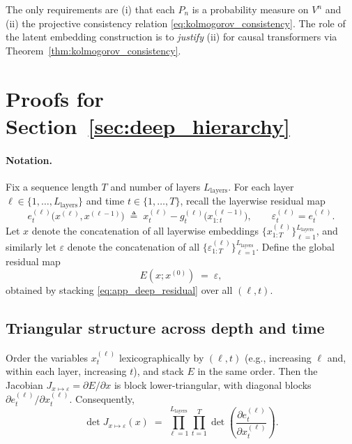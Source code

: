 \documentclass[11pt]{article}
\begin{document}
\begin{remark}
The only requirements are (i) that each $P_n$ is a probability measure on $V^n$ and (ii) the projective consistency relation
\eqref{eq:kolmogorov_consistency}. The role of the latent embedding construction is to \emph{justify} (ii)
for causal transformers via Theorem~\ref{thm:kolmogorov_consistency}.
\end{remark}


\section{Proofs for Section~\ref{sec:deep_hierarchy}}
\label{app:proofs_deep}

\paragraph{Notation.}
Fix a sequence length $T$ and number of layers $L_{\mathrm{layers}}$.
For each layer $\ell\in\{1,\dots,L_{\mathrm{layers}}\}$ and time $t\in\{1,\dots,T\}$, recall the
layerwise residual map
\begin{equation}
e^{(\ell)}_t\!\big(x^{(\ell)},x^{(\ell-1)}\big)
\;\triangleq\;
x^{(\ell)}_t - g^{(\ell)}_t\!\big(x^{(\ell-1)}_{1:t}\big),
\qquad
\varepsilon^{(\ell)}_t = e^{(\ell)}_t.
\label{eq:app_deep_residual}
\end{equation}
Let $x$ denote the concatenation of all layerwise embeddings
$\{x^{(\ell)}_{1:T}\}_{\ell=1}^{L_{\mathrm{layers}}}$, and similarly let
$\varepsilon$ denote the concatenation of all $\{\varepsilon^{(\ell)}_{1:T}\}_{\ell=1}^{L_{\mathrm{layers}}}$.
Define the global residual map
\[
E(x; x^{(0)}) \;=\; \varepsilon,
\]
obtained by stacking \eqref{eq:app_deep_residual} over all $(\ell,t)$.

\subsection{Triangular structure across depth and time}
\label{app:proof_deep_triangular}

\begin{lemma}
\label{lem:deep_block_triangular}
Order the variables $x^{(\ell)}_t$ lexicographically by $(\ell,t)$ (e.g., increasing $\ell$ and, within each layer, increasing $t$),
and stack $E$ in the same order.
Then the Jacobian $J_{x\mapsto\varepsilon}=\partial E/\partial x$ is block lower-triangular, with diagonal blocks
$\partial e^{(\ell)}_t/\partial x^{(\ell)}_t$.
Consequently,
\begin{equation}
\det J_{x\mapsto\varepsilon}(x)
\;=\;
\prod_{\ell=1}^{L_{\mathrm{layers}}}
\prod_{t=1}^{T}
\det\!\left(\frac{\partial e^{(\ell)}_t}{\partial x^{(\ell)}_t}\right).
\label{eq:app_deep_det_product}
\end{equation}
\end{lemma}
\end{document}
